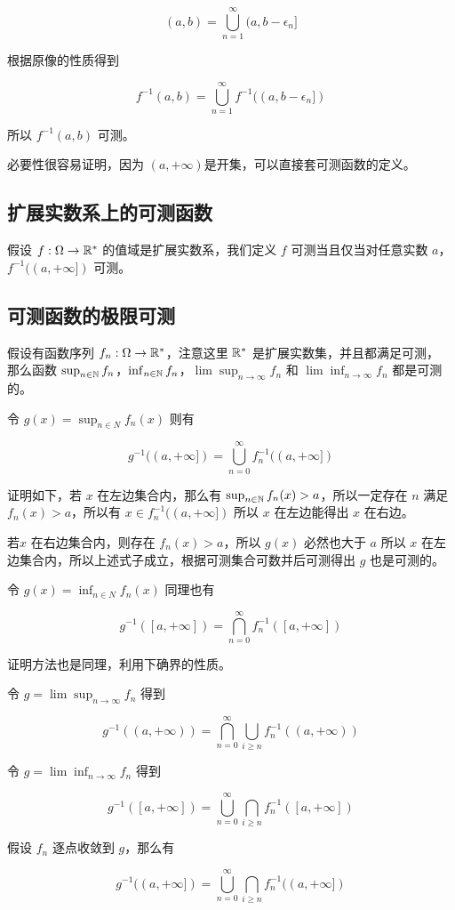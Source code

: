 \[
(a,b) = \bigcup_{n=1}^{\infty}(a, b - \epsilon_n]
\]

根据原像的性质得到

\[
f^{-1}(a,b) = \bigcup_{n=1}^{\infty} f^{-1}((a, b - \epsilon_n])
\]

所以 $f^{-1}(a,b)$ 可测。


必要性很容易证明，因为 $(a, +\infty)$是开集，可以直接套可测函数的定义。

\subsection{扩展实数系上的可测函数}

假设 $f: \Omega \to \mathbb{R}^*$ 的值域是扩展实数系，我们定义 $f$ 可测当且仅当对任意实数 $a$，$f^{-1}((a, +\infty])$ 可测。


\subsection{可测函数的极限可测}

假设有函数序列 $f_n: \Omega \to \mathbb{R}^*$，注意这里 $\mathbb{R}^*$ 是扩展实数集，并且都满足可测，
那么函数 $\sup_{n \in \mathbb{N}} f_n$，$\inf_{n \in \mathbb{N}}f_n$，$\lim \sup_{n \to \infty}f_n$ 和 
$\lim \inf_{n \to \infty}f_n$ 
都是可测的。

令 $g(x) = \sup_{n \in N}f_n(x)$ 则有

\[
g^{-1}((a, +\infty]) = \bigcup_{n = 0}^{\infty}f_n^{-1}((a, +\infty])
\]

证明如下，若 $x$ 在左边集合内，那么有 $\sup_{n \in \mathbb{N}}f_n(x) > a$，所以一定存在 $n$ 满足 $f_n(x) > a$，所以有 $x \in f_n^{-1}((a, +\infty])$
所以 $x$ 在左边能得出 $x$ 在右边。

若$x$ 在右边集合内，则存在 $f_n(x) > a$，所以 $g(x)$ 必然也大于 $a$ 所以 $x$ 在左边集合内，所以上述式子成立，根据可测集合可数并后可测得出 $g$ 也是可测的。


令 $g(x) = \inf_{n \in N}f_n(x)$ 同理也有

\[
g^{-1}([a, +\infty]) = \bigcap_{n = 0}^{\infty}f_n^{-1}([a, +\infty])
\]

证明方法也是同理，利用下确界的性质。

令 $g = \lim \sup_{n \to \infty}f_n$
得到

\[
g^{-1}((a, +\infty)) = \bigcap_{n = 0}^{\infty}\bigcup_{i \ge n}f_n^{-1}((a, +\infty))
\]


令 $g = \lim \inf_{n \to \infty}f_n$
得到

\[
g^{-1}([a, +\infty]) = \bigcup_{n = 0}^{\infty}\bigcap_{i \ge n}f_n^{-1}([a, +\infty])
\]

假设 $f_n$ 逐点收敛到 $g$，那么有

\[
g^{-1}((a, +\infty]) = \bigcup_{n = 0}^{\infty}\bigcap_{i \ge n}f_n^{-1}((a, +\infty])
\]
